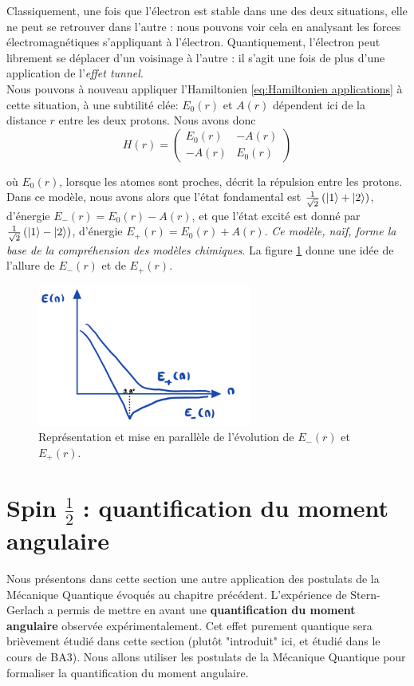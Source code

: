 \documentclass[../notesdecours.tex]{subfiles}
\begin{document}
Classiquement, une fois que l'électron est stable dans une des deux situations, elle ne peut se retrouver dans l'autre : nous pouvons voir cela en analysant les forces électromagnétiques s'appliquant à l'électron. Quantiquement, l'électron peut librement se déplacer d'un voisinage à l'autre : il s'agit une fois de plus d'une application de l'\textit{effet tunnel}.\\

Nous pouvons à nouveau appliquer l'Hamiltonien \eqref{eq:Hamiltonien applications} à cette situation, à une subtilité clée: $E_0(r)$ et $A(r)$ dépendent ici de la distance $r$ entre les deux protons. Nous avons donc
\begin{equation}
    H(r) = \begin{pmatrix}
        E_0(r) & -A(r)\\
        -A(r) & E_0(r)
    \end{pmatrix}
\end{equation}

où $E_0(r)$, lorsque les atomes sont proches, décrit la répulsion entre les protons.\\

Dans ce modèle, nous avons alors que l'état fondamental est $\frac{1}{\sqrt{2}}\left(\ket{1}+\ket{2}\right)$, d'énergie $E_-(r) = E_0(r)-A(r)$, et que l'état excité est donné par $\frac{1}{\sqrt{2}}\left(\ket{1}-\ket{2}\right)$, d'énergie $E_+(r) = E_0(r)+A(r)$. \emph{Ce modèle, naïf, forme la base de la compréhension des modèles chimiques}. \color{purple} La figure \ref{fig:comparaison E+ et E-} donne une idée de l'allure de $E_-(r)$ et de $E_+(r)$.\color{black}

\begin{figure}[h]
    \centering
    \includegraphics[width=7cm,scale=0.5]{Chapitre 5/Figure 6.jpg}
    \caption{Représentation et mise en parallèle de l'évolution de $E_-(r)$ et $E_+(r)$.}
    \label{fig:comparaison E+ et E-}
\end{figure}

\section{Spin $\frac{1}{2}$ : quantification du moment angulaire}
Nous présentons dans cette section une autre application des postulats de la Mécanique Quantique évoqués au chapitre précédent. L'expérience de Stern-Gerlach a permis de mettre en avant une \textbf{quantification du moment angulaire} observée expérimentalement. Cet effet purement quantique sera brièvement étudié dans cette section (plutôt "introduit" ici, et étudié dans le cours de BA3). Nous allons utiliser les postulats de la Mécanique Quantique pour formaliser la quantification du moment angulaire. \\
\end{document}
